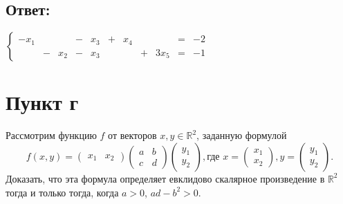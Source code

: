 \documentclass[12pt]{article}
\begin{document}
    \subsection*{Ответ:}
    $
    \left \{
    \begin{array}{ccccccccccc}
        -x_1 &   &     & - & x_3 & + & x_4 &   &       & = & -2 \\
        & - & x_2 & - & x_3 &   &     & + & 3 x_5 & = & -1
    \end{array}
    \right .
    $

    \section*{Пункт г}
    Рассмотрим функцию $f$ от векторов $x, y \in \mathbb{R}^2$, заданную формулой
    \[
        f(x,y) =
        \begin{pmatrix}
            x_1 & x_2
        \end{pmatrix}
        \begin{pmatrix}
            a & b \\
            c & d
        \end{pmatrix}
        \begin{pmatrix}
            y_1 \\
            y_2
        \end{pmatrix}
        ,
        \text{где }
        x =
        \begin{pmatrix}
            x_1 \\
            x_2
        \end{pmatrix},
        y =
        \begin{pmatrix}
            y_1 \\
            y_2
        \end{pmatrix}.
    \]
    Доказать, что эта формула определяет евклидово скалярное произведение в $\mathbb{R}^2$ тогда и только тогда, когда $a > 0$, $ad - b^2 > 0$.
\end{document}
